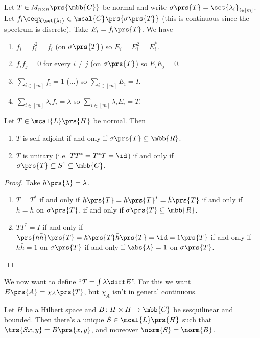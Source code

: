 \documentclass[10pt, twoside]{book}
\begin{document}
\begin{example}
Let $T \in M_{n \times n}\prs{\mbb{C}}$ be normal and write $\sigma\prs{T} = \set{\lambda_i}_{i \in [m]}$. Let $f_i \ceq \chi_{\set{\lambda_i}} \in \mcal{C}\prs{\sigma\prs{T}}$ (this is continuous since the spectrum is discrete).
Take $E_i = f_i\prs{T}$.
We have
\begin{enumerate}
\item $f_i = f_i^2 = \bar{f}_i$ (on $\sigma\prs{T}$) so $E_i = E_i^2 = E_i^*$.
\item $f_i f_j = 0$ for every $i \neq j$ (on $\sigma\prs{T}$) so $E_i E_j = 0$.
\item $\sum_{i \in [m]} f_i = 1$ (...) so $\sum_{i \in [m]} E_i = I$.
\item $\sum_{i \in [m]} \lambda_i f_i = \lambda$ so $\sum_{i \in [m]} \lambda_i E_i = T$.
\end{enumerate}
\end{example}

\begin{proposition}
Let $T \in \mcal{L}\prs{H}$ be normal.
Then
\begin{enumerate}
\item $T$ is self-adjoint if and only if $\sigma\prs{T} \subseteq \mbb{R}$.
\item $T$ is unitary (i.e. $T T^* = T^* T = \id$) if and only if $\sigma\prs{T} \subseteq S^1 \subseteq \mbb{C}$.
\end{enumerate}
\end{proposition}

\begin{proof}
Take $h\prs{\lambda} = \lambda$.
\begin{enumerate}
\item $T = T^*$ if and only if $h\prs{T} = h\prs{T}^* = \bar{h}\prs{T}$ if and only if $h = \bar{h}$ on $\sigma\prs{T}$, if and only if $\sigma\prs{T} \subseteq \mbb{R}$.
\item $T T^* = I$ if and only if $\prs{h \bar{h}}\prs{T} = h\prs{T} \bar{h}\prs{T} = \id = 1\prs{T}$ if and only if $h \bar{h} = 1$ on $\sigma\prs{T}$ if and only if $\abs{\lambda} = 1$ on $\sigma\prs{T}$.
\end{enumerate}
\end{proof}

We now want to define ``$T = \int \lambda \diff E$''. For this we want $E\prs{A} = \chi_A\prs{T}$, but $\chi_A$ isn't in general continuous.

\begin{lemma}
Let $H$ be a Hilbert space and $B \colon H \times H \to \mbb{C}$ be sesquilinear and bounded.
Then there's a unique $S \in \mcal{L}\prs{H}$ such that $\trs{Sx, y} = B\prs{x,y}$, and moreover $\norm{S} = \norm{B}$.
\end{lemma}
\end{document}

